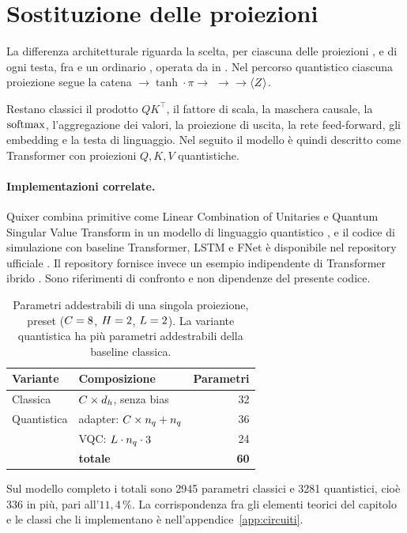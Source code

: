 \section{Sostituzione delle proiezioni}
\label{sec:corrispondenza-gpt}
\label{ssec:punto-sostituzione}

La differenza architetturale riguarda la scelta, per ciascuna delle proiezioni
,  e  di ogni testa, fra
 e un ordinario , operata da
 in
. Nel percorso quantistico ciascuna proiezione
segue la catena  $\to\tanh\cdot\pi\to$  $\to$
 $\to\langle Z \rangle$.

Restano classici il prodotto $QK^{\top}$, il fattore di scala, la maschera
causale, la $\operatorname{softmax}$, l'aggregazione dei valori, la proiezione di uscita, la
rete feed-forward, gli embedding e la testa di linguaggio. Nel seguito il modello
è quindi descritto come Transformer con proiezioni $Q,K,V$ quantistiche.

\paragraph{Implementazioni correlate.} Quixer combina primitive come Linear
Combination of Unitaries e Quantum Singular Value Transform in un modello di
linguaggio quantistico \parencite{khatri2024quixer}, e il codice di simulazione
con baseline Transformer, LSTM e FNet è disponibile nel repository ufficiale
\parencite{quantinuumQuixerRepo}. Il repository 
fornisce invece un esempio indipendente di Transformer ibrido
\parencite{disipioQTransformerRepo}. Sono riferimenti di confronto e non
dipendenze del presente codice.

\begin{table}[htbp]
\centering
\caption[Parametri per proiezione $Q$, $K$ o $V$]{%
Parametri addestrabili di una singola proiezione, preset 
($C = 8$, $H = 2$, $L = 2$). La variante quantistica ha più
parametri addestrabili della baseline classica.}
\label{tab:parametri-proiezione}
\small
\begin{tabular}{@{}l l r@{}}
\toprule
\textbf{Variante} & \textbf{Composizione} & \textbf{Parametri} \\
\midrule
Classica    & $C \times d_h$, senza bias & 32 \\
\midrule
Quantistica & adapter: $C \times n_q + n_q$ & 36 \\
            & VQC: $L \cdot n_q \cdot 3$ & 24 \\
            & \textbf{totale} & \textbf{60} \\
\bottomrule
\end{tabular}
\end{table}

Sul modello completo i totali sono \num{2945} parametri classici e \num{3281}
quantistici, cioè \num{336} in più, pari all'$11{,}4\,\%$. La corrispondenza fra
gli elementi teorici del capitolo e le classi che li implementano è
nell'appendice~\ref{app:circuiti}.
